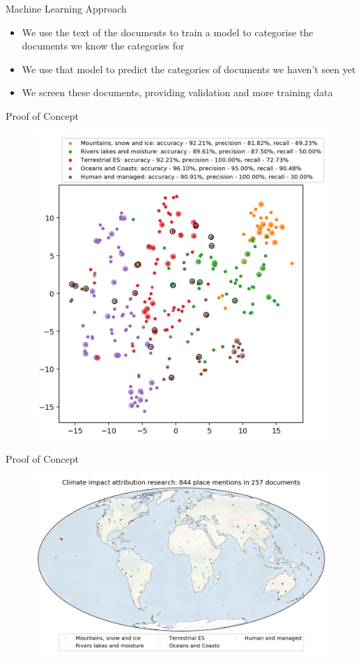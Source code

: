 \documentclass[9pt]{beamer}
\begin{document}
\begin{frame}{Machine Learning Approach}

\begin{itemize}
	\item We use the text of the documents to train a model to categorise the documents we know the categories for
	\item We use that model to predict the categories of documents we haven't seen yet
	\item We screen these documents, providing validation and more training data
\end{itemize}

\end{frame}

\begin{frame}{Proof of Concept}

\begin{figure}
	\includegraphics[width=0.75\linewidth]{../plots/original_predictions.png}
\end{figure}

\end{frame}

\begin{frame}{Proof of Concept}

\begin{figure}
	\includegraphics[width=\linewidth]{../plots/original_map.png}
\end{figure}

\end{frame}
\end{document}
